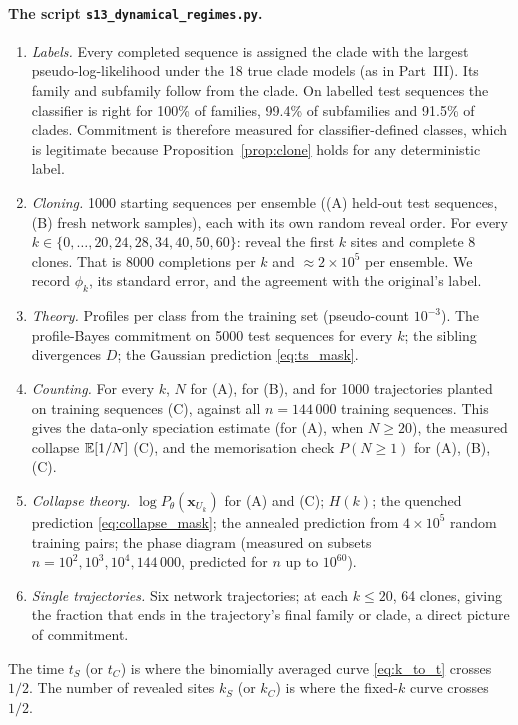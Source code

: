 \paragraph{The script \texttt{s13\_dynamical\_regimes.py}.}
\begin{enumerate}[nosep]
\item \emph{Labels.} Every completed sequence is assigned the clade with the largest pseudo-log-likelihood under the 18
true clade models (as in Part~III). Its family and subfamily follow from the clade. On labelled test sequences
the classifier is right for 100\% of families, 99.4\% of subfamilies and 91.5\% of clades. Commitment is therefore
measured for classifier-defined classes, which is legitimate because Proposition~\ref{prop:clone} holds for any
deterministic label.
\item \emph{Cloning.} 1000 starting sequences per ensemble ((A) held-out test sequences, (B) fresh network samples),
each with its own random reveal order. For every $k\in\{0,\dots,20,24,28,34,40,50,60\}$: reveal the first $k$
sites and complete 8 clones. That is 8000 completions per $k$ and $\approx2\times10^5$ per ensemble. We record
$\phi_k$, its standard error, and the agreement with the original's label.
\item \emph{Theory.} Profiles per class from the training set (pseudo-count $10^{-3}$). The profile-Bayes commitment on
5000 test sequences for every $k$; the sibling divergences $D$; the Gaussian prediction \eqref{eq:ts_mask}.
\item \emph{Counting.} For every $k$, $N$ for (A), for (B), and for 1000 trajectories planted on training sequences
(C), against all $n=144\,000$ training sequences. This gives the data-only speciation estimate (for (A), when
$N\ge20$), the measured collapse $\mathbb{E}[1/N]$ (C), and the memorisation check $P(N\ge1)$ for (A), (B), (C).
\item \emph{Collapse theory.} $\log P_\theta(\bm x_{U_k})$ for (A) and (C); $H(k)$; the quenched prediction
\eqref{eq:collapse_mask}; the annealed prediction from $4\times10^5$ random training pairs; the phase diagram
(measured on subsets $n=10^2,10^3,10^4,144\,000$, predicted for $n$ up to $10^{60}$).
\item \emph{Single trajectories.} Six network trajectories; at each $k\le20$, 64 clones, giving the fraction that
ends in the trajectory's final family or clade, a direct picture of commitment.
\end{enumerate}
The time $t_S$ (or $t_C$) is where the binomially averaged curve \eqref{eq:k_to_t} crosses $1/2$. The number of
revealed sites $k_S$ (or $k_C$) is where the fixed-$k$ curve crosses $1/2$.

